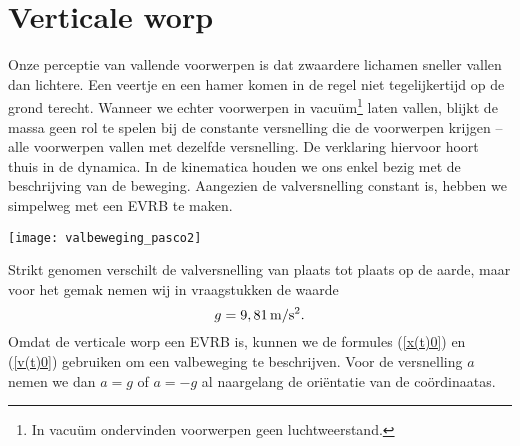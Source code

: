 \documentclass{ximera}
\begin{document}
	\author{Bart Lambregs}
    \xmsource


	\section{Verticale worp}

	Onze perceptie van vallende voorwerpen is dat zwaardere lichamen sneller vallen dan lichtere. Een veertje en een hamer komen in de regel niet tegelij\-ker\-tijd op de grond terecht. Wanneer we echter voorwerpen in vacu\"um\footnote{In vacu\"um ondervinden voorwerpen geen luchtweerstand.} laten vallen, blijkt de massa geen rol te spelen bij de constante versnelling die de voorwerpen krijgen -- alle voorwerpen vallen met dezelfde versnelling. De verklaring hiervoor hoort thuis in de dynamica. In de kinematica houden we ons enkel bezig met de beschrijving van de beweging. Aangezien de valversnelling constant is, hebben we simpelweg met een EVRB te maken.
	\begin{image}
	
	\texttt{[image: valbeweging\_pasco2]}
	\end{image}
	Strikt genomen verschilt de valversnelling van plaats tot plaats op de aarde, maar voor het gemak nemen wij in vraagstukken de waarde
	\[g=9,81\rm\,m/s^2.\]
	Omdat de verticale worp een EVRB is, kunnen we de formules (\ref{x(t)0}) en (\ref{v(t)0}) gebruiken om een valbeweging te beschrijven. Voor de versnelling $a$ nemen we dan $a=g$ of $a=-g$ al naargelang de ori\"entatie van de co\"ordinaatas.
	
	\clearpage
	
\end{document}
